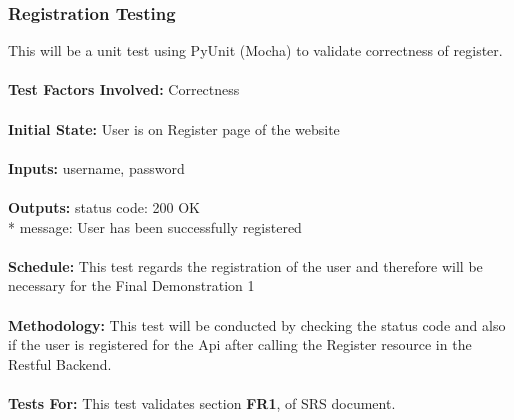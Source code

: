 \documentclass[12pt, titlepage]{article}
\begin{document}
\subsubsection{{Registration Testing}}
This will be a unit test using PyUnit (Mocha) to validate correctness of register. \\
\\
\textbf{Test Factors Involved:} Correctness \\
\\
\textbf{Initial State: } User is on Register page of the website \\
\\
\textbf{Inputs: } username, password \\
\\
\textbf{Outputs:} status code: 200 OK \\*
                  message: User has been successfully registered \\
\\
\textbf{Schedule:} This test regards the registration of the user and therefore will be necessary for the Final Demonstration 1 \\
\\
\textbf{Methodology: } This test will be conducted by checking the status code and also if the user is registered for the Api after calling the Register resource in the Restful Backend. \\
\\
\textbf{Tests For:} This test validates section \textbf{FR1}, of SRS document.

\end{document}
